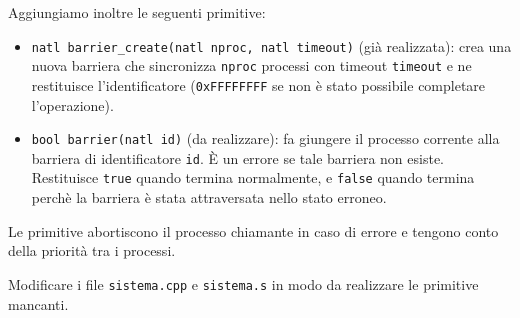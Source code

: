 Aggiungiamo inoltre le seguenti primitive:
\begin{itemize}
  \item \verb|natl barrier_create(natl nproc, natl timeout)| (gi\`a realizzata):
   	crea una nuova barriera che sincronizza \verb|nproc| processi con timeout \verb|timeout|
	e ne restituisce l'identificatore (\verb|0xFFFFFFFF| se non \`e stato possibile completare l'operazione).
   \item \verb|bool barrier(natl id)| (da realizzare):
   	fa giungere il processo corrente alla barriera di identificatore \verb|id|. \`E un errore
	se tale barriera non esiste. Restituisce \verb|true| quando termina normalmente, e \verb|false|
	quando termina perch\`e la barriera \`e stata attraversata nello stato erroneo.
\end{itemize}

Le primitive abortiscono il processo chiamante in caso di errore e tengono conto della priorit\`a tra i processi.

Modificare i file \verb|sistema.cpp| e \verb|sistema.s| in modo da realizzare le primitive mancanti.

